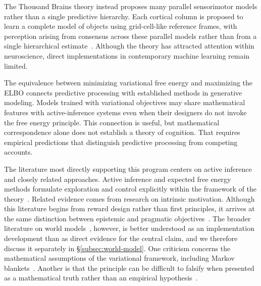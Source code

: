 \documentclass[acmsmall,screen,review,anonymous]{acmart}
\begin{document}
The Thousand Brains theory instead proposes many parallel sensorimotor models rather than a single predictive hierarchy. 
%
Each cortical column is proposed to learn a complete model of objects using grid-cell-like reference frames, with perception arising from consensus across these parallel models rather than from a single hierarchical estimate~\citep{hawkins2004, hawkins2021thousand}.
%
Although the theory has attracted attention within neuroscience, direct implementations in contemporary machine learning remain limited.

The equivalence between minimizing variational free energy and maximizing the ELBO connects predictive processing with established methods in generative modeling.
%
Models trained with variational objectives may share mathematical features with active-inference systems even when their designers do not invoke the free energy principle.
%
This connection is useful, but mathematical correspondence alone does not establish a theory of cognition.
%
That requires empirical predictions that distinguish predictive processing from competing accounts.

The literature most directly supporting this program centers on active inference and closely related approaches.
%
Active inference and expected free energy methods formulate exploration and control explicitly within the framework of the theory~\citep{fountas2020deepactiveinferenceagents, mazzaglia2021contrastive, tschantz2020scaling}. 
%
Related evidence comes from research on intrinsic motivation.
%
Although this literature begins from reward design rather than first principles, it arrives at the same distinction between epistemic and pragmatic objectives~\citep{houthooft2017vimevariationalinformationmaximizing, pmlr-v70-pathak17a, pmlr-v119-sekar20a}.
%
The broader literature on world models~\citep{ha2018recurrentworld, hafner2020dreamcontrollearningbehaviors}, however, is better understood as an implementation development than as direct evidence for the central claim, and we therefore discuss it separately in \S\ref{subsec:world-model}.
%
One criticism concerns the mathematical assumptions of the variational framework, including Markov blankets~\citep{bruineberg2022}.
%
Another is that the principle can be difficult to falsify when presented as a mathematical truth rather than an empirical hypothesis~\citep{andrews2021}.
\end{document}
